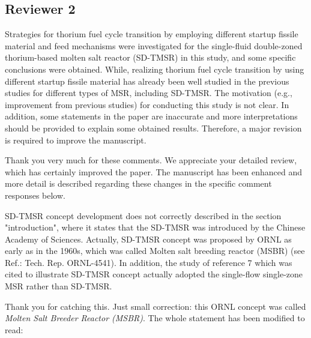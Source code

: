 \documentclass[answers,11pt]{exam}
\begin{document}
\begin{questions}
	
        \section*{Reviewer 2}

        \question Strategies for thorium fuel cycle transition by employing different startup fissile material and feed mechanisms were investigated for the single-fluid double-zoned thorium-based molten salt reactor (SD-TMSR) in this study, and some specific conclusions were obtained. While, realizing thorium fuel cycle transition by using different startup fissile material has already been well studied in the previous studies for different types of MSR, including SD-TMSR. The motivation (e.g., improvement from previous studies) for conducting this study is not clear. In addition, some statements in the paper are inaccurate and more interpretations should be provided to explain some obtained results. Therefore, a major revision is required to improve the manuscript.
        
        \begin{solution}
                Thank you very much for these comments. We appreciate your detailed review, which has certainly improved the paper. The manuscript has been enhanced and more detail is described regarding these changes in the specific comment responses below.
        \end{solution}


        \question SD-TMSR concept development does not correctly described in the section "introduction", where it states that the SD-TMSR was introduced by the Chinese Academy of Sciences. Actually, SD-TMSR concept was proposed by ORNL as early as in the 1960s, which was called Molten salt breeding reactor (MSBR) (see Ref.: Tech. Rep. ORNL-4541). In addition, the study of reference 7 which was cited to illustrate SD-TMSR concept actually adopted the single-flow single-zone MSR rather than SD-TMSR.
        
        \begin{solution}
                 Thank you for catching this. Just small correction: this ORNL 
                 concept was called \emph{Molten Salt Breeder Reactor (MSBR)}. 
                 The whole statement has been 
                 modified to read:\\
                 

\end{solution}
\end{questions}
\end{document}
